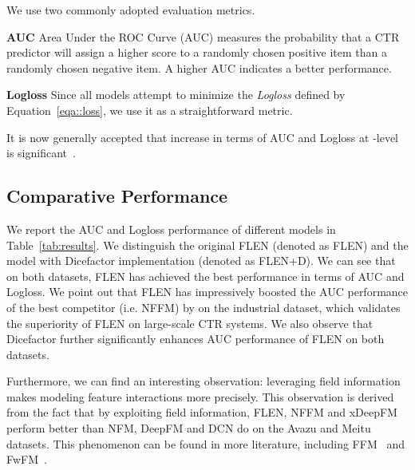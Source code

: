 \documentclass[sigconf]{acmart}
\begin{document}
We use two commonly adopted evaluation metrics.

\textbf{AUC} Area Under the ROC Curve (AUC) measures the probability that a CTR predictor will assign a higher score to a randomly chosen positive item than a randomly chosen negative item. A higher AUC indicates a better performance.

\textbf{Logloss} Since all models attempt to minimize the \textit{Logloss} defined by Equation~\ref{eqa::loss}, we use it as a straightforward metric.

It is now generally accepted that increase in terms of AUC and Logloss at -level is significant~\citep{cheng2016wide,guo2017deepfm,wang2017deep}. 


\subsection{Comparative Performance}\label{sec::result}
We report the AUC and Logloss performance of different models in Table~\ref{tab:results}. 
We distinguish the original FLEN (denoted as FLEN) and the model with Dicefactor implementation (denoted as FLEN+D). 
We can see that on both datasets, FLEN has achieved the best performance in terms of AUC and Logloss. 
We point out that FLEN has impressively boosted the AUC performance of the best competitor (i.e. NFFM) by  on the industrial dataset, which validates the superiority of FLEN on large-scale CTR systems. 
We also observe that Dicefactor further significantly enhances AUC performance of FLEN on both datasets.   

Furthermore, we can find an interesting observation: leveraging field information makes modeling feature interactions more precisely. This observation is derived from the fact that by exploiting field information, FLEN, NFFM and xDeepFM perform better than NFM, DeepFM and DCN do on the Avazu and Meitu datasets. 
This phenomenon can be found in more literature, including FFM~\citep{juan2017field} and FwFM~\citep{pan2018field}.
\end{document}
